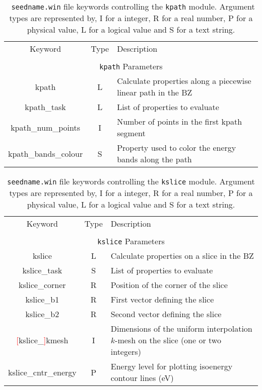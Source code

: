 \begin{table}[hH!]
\begin{center}
\begin{tabular}{|c|c|p{6cm}|}
  \hline
  Keyword & Type & Description \\
  &      &             \\
  \hline\hline
  \multicolumn{3}{|c|}{{\tt kpath} Parameters} \\
  \hline
  {\sc kpath}  & L & Calculate properties along a piecewise linear path in the BZ \\
  {\sc kpath\_task}& L & List of properties to evaluate\\
  {\sc kpath\_num\_points}& I & Number of points in the first kpath segment\\
  {\sc kpath\_bands\_colour}& S & Property used to color the energy bands along the path\\
  \hline
\end{tabular}
\caption[Parameter file keywords controlling the kpath module.]  {{\tt
    seedname.win} file keywords controlling the {\tt kpath}
  module. Argument types are represented by, I for a integer, R for a
  real number, P for a physical value, L for a logical value and S for
  a text string.}
\label{parameter_keywords_kpath}
\end{center}
\end{table}

\begin{table}[hH!]
\begin{center}
\begin{tabular}{|c|c|p{6cm}|}
  \hline
  Keyword & Type & Description \\
  &      &             \\
  \hline\hline
  \multicolumn{3}{|c|}{{\tt kslice} Parameters} \\
  \hline
  {\sc kslice}  & L & Calculate properties on a slice in the BZ \\
  {\sc kslice\_task}& S & List of properties to evaluate\\
  {\sc kslice\_corner}& R & Position of the corner of the slice\\
  {\sc kslice\_b1}& R & First vector defining the slice\\
  {\sc kslice\_b2}& R & Second vector defining the slice\\
  {\sc \textcolor{red}{[}kslice\_\textcolor{red}{]}kmesh}& I & Dimensions of the uniform interpolation 
$k$-mesh on the slice (one or two integers)\\
  {\sc kslice\_cntr\_energy}& P & Energy level for  plotting 
isoenergy contour lines (eV)\\
  \hline
\end{tabular}
\caption[Parameter file keywords controlling the kslice module.]
{{\tt seedname.win} file keywords controlling the {\tt kslice}
  module. Argument types are represented by, I for a integer, R for a
  real number, P for a physical value, L for a logical value and S for
  a text string.}
\label{parameter_keywords_kslice}
\end{center}
\end{table}



